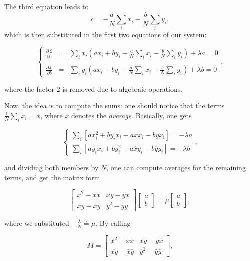 \documentclass[10pt]{report}
\begin{document}
The third equation leads to
\[c = -\frac{a}{N}\sum_i x_i -\frac{b}{N}\sum_i y_i,\] which is then
substituted in the first two equations of our system:

\[ \left\{ \begin{array}{lll} \frac{\partial \mathcal{L}}{\partial a} & = & \sum_i x_i(ax_i + by_i -\frac{a}{N}\sum_i x_i -\frac{b}{N}\sum_i y_i) + \lambda a = 0 \\ \\ \frac{\partial \mathcal{L}}{\partial b} & = & \sum_i y_i(ax_i + by_i -\frac{a}{N}\sum_i x_i -\frac{b}{N}\sum_i y_i) + \lambda b = 0 \end{array} \right. , \]

where the factor \(2\) is removed due to algebraic operations.

Now, the idea is to compute the sums: one should notice that the terms
\(\frac{1}{N}\sum_i x_i = \overline{x}\), where \(\overline{x}\) denotes
the \emph{average}. Basically, one gets

\[ \left\{ \begin{array}{l} \sum_i \left[ax_i^2 + by_i x_i -a\overline{x} x_i -b \overline{y}x_i\right] = -\lambda a\\ \sum_i \left[a y_i x_i + by_i^2 -a\overline{x} y_i -b\overline{y}y_i\right] = -\lambda b \end{array} \right. , \]

and dividing both members by \(N\), one can compute averages for the
remaining terms, and get the matrix form

\[ \begin{bmatrix} \overline{x}^2 - \bar{x}\bar{x} & \overline{xy} - \bar{y}\bar{x} \\ \overline{xy}- \bar{x}\bar{y} & \overline{y}^2 - \bar{y}\bar{y} \end{bmatrix} \begin{bmatrix} a\\ b \end{bmatrix} = \mu \begin{bmatrix} a\\ b \end{bmatrix}, \]

where we substituted \(\displaystyle-\frac{\lambda}{N} \doteq \mu\). By calling

\[ M = \begin{bmatrix} \overline{x}^2 - \bar{x}\bar{x} & \overline{xy} - \bar{y}\bar{x} \\ \overline{xy}- \bar{x}\bar{y} & \overline{y}^2 - \bar{y}\bar{y} \end{bmatrix}, \]
\end{document}
